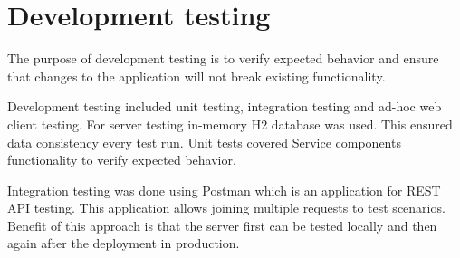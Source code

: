 
\section{Development testing}\label{sec:dev-testing}

The purpose of development testing is to verify expected behavior and ensure that changes to the application will not break existing functionality.

Development testing included unit testing, integration testing and ad-hoc web client testing.
For server testing in-memory H2 database was used.
This ensured data consistency every test run.
Unit tests covered Service components functionality to verify expected behavior.

Integration testing was done using Postman which is an application for REST API testing.
This application allows joining multiple requests to test scenarios.
Benefit of this approach is that the server first can be tested locally and then again after the deployment in production.